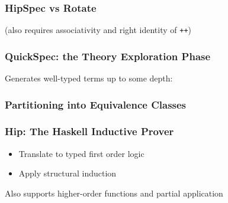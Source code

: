 \documentclass[serif,professionalfont]{beamer}
\newcommand\dn[0]{\vspace{\baselineskip}}
\newcommand\hs[1]{\texttt{#1}}
\begin{document}


\begin{frame}
    \frametitle{HipSpec vs Rotate}

    \rotategen

    \pause
    \begin{center}
    (also requires associativity and right identity of \hs{++})
    \end{center}

\end{frame}

\begin{comment} %
  Prove properties of functional programs using rewriting and
  induction.

  {\color{Purpleee} Problem:} Som properties require lemmas to be proved, that

  \begin{itemize}
    \item Needs to be conjectured,
    \item Requires induction to be proved, and
    \item Might require lemmas themselves
  \end{itemize}
\end{comment}


\begin{frame}
    \frametitle{QuickSpec: the Theory Exploration Phase}
    Generates well-typed terms up to some depth:
    \dn
    
\end{frame}

\begin{frame}
    \frametitle{Partitioning into Equivalence Classes}

    


\end{frame}

\begin{frame}[fragile]
  \frametitle{Hip: The Haskell Inductive Prover}

  \begin{itemize}
    \item Translate to typed first order logic
    \item Apply structural induction

  \end{itemize}

  Also supports higher-order functions and partial application
\end{frame}
\end{document}
